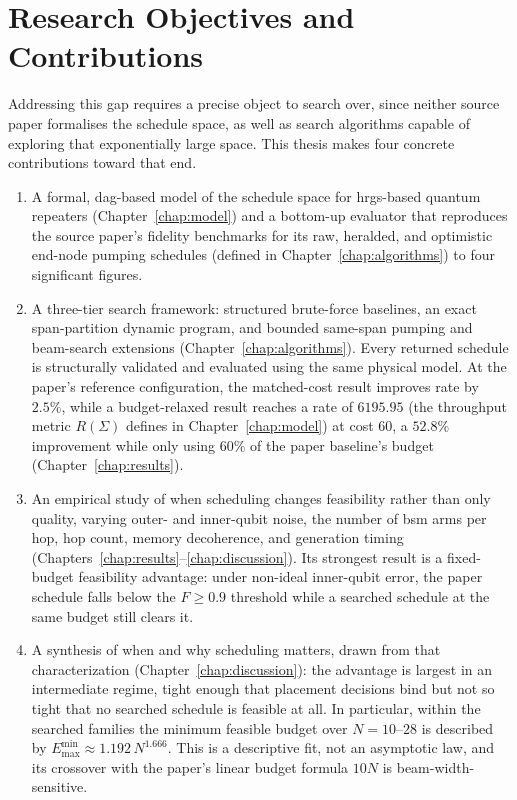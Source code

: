 \section{Research Objectives and Contributions}
\label{sec:intro:contributions}

Addressing this gap requires a precise object to search over, since neither source paper formalises the schedule space, as well as search algorithms capable of exploring that exponentially large space. This thesis makes four concrete contributions toward that end.

\begin{enumerate}
    \item A formal, \Gls{dag}-based model of the schedule space for \Gls{hrgs}-based quantum repeaters (Chapter~\ref{chap:model}) and a bottom-up evaluator that reproduces the source paper's fidelity benchmarks for its raw, heralded, and optimistic end-node pumping schedules (defined in Chapter~\ref{chap:algorithms}) to four significant figures.

    \item A three-tier search framework: structured brute-force baselines, an exact span-partition dynamic program, and bounded same-span pumping and beam-search extensions (Chapter~\ref{chap:algorithms}). Every returned schedule is structurally validated and evaluated using the same physical model. At the paper's reference configuration, the matched-cost result improves rate by $2.5\%$, while a budget-relaxed result reaches a rate of $6195.95$ (the throughput metric $R(\Sigma)$ defines in Chapter~\ref{chap:model}) at cost $60$, a $52.8\%$ improvement while only using $60\%$ of the paper baseline's budget (Chapter~\ref{chap:results}).

    \item An empirical study of when scheduling changes feasibility rather than only quality, varying outer- and inner-qubit noise, the number of \Gls{bsm} arms per hop, hop count, memory decoherence, and generation timing (Chapters~\ref{chap:results}--\ref{chap:discussion}). Its strongest result is a fixed-budget feasibility advantage: under non-ideal inner-qubit error, the paper schedule falls below the $F \ge 0.9$ threshold while a searched schedule at the same budget still clears it.

    \item A synthesis of when and why scheduling matters, drawn from that characterization (Chapter~\ref{chap:discussion}): the advantage is largest in an intermediate regime, tight enough that placement decisions bind but not so tight that no searched schedule is feasible at all. In particular, within the searched families the minimum feasible budget over $N=10$--$28$ is described by $E_{\max}^{\min} \approx 1.192\,N^{1.666}$. This is a descriptive fit, not an asymptotic law, and its crossover with the paper's linear budget formula $10N$ is beam-width-sensitive.

\end{enumerate}

